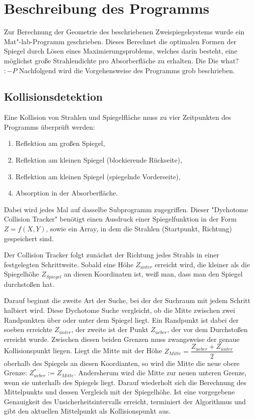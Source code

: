 \documentclass[fontsize=10pt,paper=a4,bibliography=totoc]{scrartcl}
\newcommand{\felix}[1]{{ \color{darkgreen} #1}}
\newcommand{\maxim}[1]{{ \color{blue} #1}}
\begin{document}
\section{Beschreibung des Programms}
\maxim{
Zur Berechnung der Geometrie des beschriebenen Zweispiegelsystems wurde ein Mat"-lab-Programm geschrieben. Dieses Berechnet die optimalen Formen der Spiegel durch Lösen eines Maximierungsproblems, welches darin besteht, eine möglichst große Strahlendichte pro Absorberfläche zu erhalten. Die } \felix{Die what? $:-P$}\maxim{
Nachfolgend wird die Vorgehensweise des Programms grob beschrieben.
}

\felix{
\subsection*{Kollisionsdetektion}
Eine Kollision von Strahlen und Spiegelfläche muss zu vier Zeitpunkten des Programms überprüft werden:
\begin{enumerate}
\item Reflektion am großen Spiegel,
\item Reflektion am kleinen Spiegel (blockierende Rückseite),
\item Reflektion am kleinen Spiegel (spiegelnde Vorderseite),
\item Absorption in der Absorberfläche.
\end{enumerate}
Dabei wird jedes Mal auf dasselbe Subprogramm zugegriffen. Dieser "Dychotome Collision Tracker" benötigt einen Ausdruck einer Spiegelfunktion in der Form $Z = f(X,Y)$, sowie ein Array, in dem die Strahlen (Startpunkt, Richtung) gespeichert sind.


Der Collision Tracker folgt zunächst der Richtung jedes Strahls in einer festgelegten Schrittweite. Sobald eine Höhe $Z_{unter}$ erreicht wird, die kleiner als die Spiegelhöhe $Z_{Spiegel}$ an diesen Koordinaten ist, weiß man, dass man den Spiegel durchstoßen hat.


Darauf beginnt die zweite Art der Suche, bei der der Suchraum mit jedem Schritt halbiert wird. Diese Dychotome Suche vergleicht, ob die Mitte zwischen zwei Randpunkten über oder unter dem Spiegel liegt. Ein Randpunkt ist dabei der soeben erreichte $Z_{unter}$, der zweite ist der Punkt $Z_{ueber}$, der vor dem Durchstoßen erreicht wurde. Zwischen diesen beiden Grenzen muss zwangsweise der genaue Kollisionspunkt liegen. Liegt die Mitte mit der Höhe $Z_{Mitte} = \dfrac{Z_{ueber} + Z_{unter}}{2}$ oberhalb des Spiegels an diesen Koordianten, so wird die Mitte die neue obere Grenze: $Z^{\ast}_{ueber} := Z_{Mitte}$. Andersherum wird die Mitte zur neuen unteren Grenze, wenn sie unterhalb des Spiegels liegt. Darauf wiederholt sich die Berechnung des Mittelpunkts und dessen Vergleich mit der Spiegelhöhe. Ist eine vorgegebene Genauigkeit des Unsicherheitsintervalls erreicht, terminiert der Algorithmus und gibt den aktuellen Mittelpunkt als Kollisionspunkt aus.
}
\end{document}
